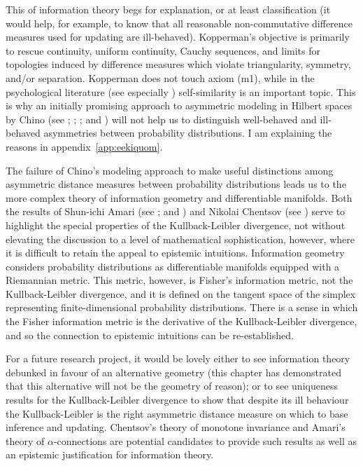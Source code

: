 \documentclass[phd,12pt,oneside]{ubcthesis}
\begin{document}
This  of information theory begs for explanation,
or at least classification (it would help, for example, to know that
all reasonable non-commutative difference measures used for updating
are ill-behaved). Kopperman's objective is primarily to rescue
continuity, uniform continuity, Cauchy sequences, and limits for
topologies induced by difference measures which violate triangularity,
symmetry, and/or separation. Kopperman does not touch axiom (m1),
while in the psychological literature (see especially
) self-similarity is an important topic. This is
why an initially promising approach to asymmetric modeling in Hilbert
spaces by Chino (see ; ;
; and ) will not
help us to distinguish well-behaved and ill-behaved asymmetries
between probability distributions. I am explaining the reasons in
appendix~\ref{app:eekiquom}.

The failure of Chino's modeling approach to make useful distinctions
among asymmetric distance measures between probability distributions
leads us to the more complex theory of information geometry and
differentiable manifolds. Both the results of Shun-ichi Amari (see
; and ) and Nikolai
Chentsov (see ) serve to highlight the special
properties of the Kullback-Leibler divergence, not without elevating
the discussion to a level of mathematical sophistication, however,
where it is difficult to retain the appeal to epistemic intuitions.
Information geometry considers probability distributions as
differentiable manifolds equipped with a Riemannian metric. This
metric, however, is Fisher's information metric, not the
Kullback-Leibler divergence, and it is defined on the tangent space of
the simplex representing finite-dimensional probability distributions.
There is a sense in which the Fisher information metric is the
derivative of the Kullback-Leibler divergence, and so the connection
to epistemic intuitions can be re-established.

For a future research project, it would be lovely either to see
information theory debunked in favour of an alternative geometry (this
chapter has demonstrated that this alternative will not be the geometry
of reason); or to see uniqueness results for the Kullback-Leibler
divergence to show that despite its ill behaviour the Kullback-Leibler
is the right asymmetric distance measure on which to base inference
and updating. Chentsov's theory of monotone invariance and Amari's
theory of $\alpha$-connections are potential candidates to provide
such results as well as an epistemic justification for information
theory.
\end{document}
